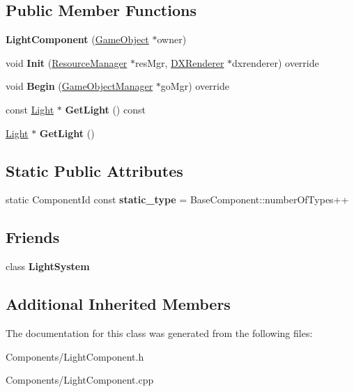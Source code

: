 \subsection*{Public Member Functions}
\begin{DoxyCompactItemize}
\item 
\mbox{\label{classLightComponent_ac374477ea9f077553f23f57313d9338d}} 
{\bfseries Light\+Component} (\hyperlink{classGameObject}{Game\+Object} $\ast$owner)
\item 
\mbox{\label{classLightComponent_abb4382140092cd7b54f3cf1d37a31c7b}} 
void {\bfseries Init} (\hyperlink{classResourceManager}{Resource\+Manager} $\ast$res\+Mgr, \hyperlink{classDXRenderer}{D\+X\+Renderer} $\ast$dxrenderer) override
\item 
\mbox{\label{classLightComponent_a5cb42a615fc057b75e003e69aee729ef}} 
void {\bfseries Begin} (\hyperlink{classGameObjectManager}{Game\+Object\+Manager} $\ast$go\+Mgr) override
\item 
\mbox{\label{classLightComponent_ae1443763b20f9aa6167a774b193a67bd}} 
const \hyperlink{classLight}{Light} $\ast$ {\bfseries Get\+Light} () const
\item 
\mbox{\label{classLightComponent_a22972b771f48b615fab04ab09f214225}} 
\hyperlink{classLight}{Light} $\ast$ {\bfseries Get\+Light} ()
\end{DoxyCompactItemize}
\subsection*{Static Public Attributes}
\begin{DoxyCompactItemize}
\item 
\mbox{\label{classLightComponent_a4fa80064b4e8acd677e551783f827c56}} 
static Component\+Id const {\bfseries static\+\_\+type} = Base\+Component\+::number\+Of\+Types++
\end{DoxyCompactItemize}
\subsection*{Friends}
\begin{DoxyCompactItemize}
\item 
\mbox{\label{classLightComponent_acad5260b1bd2b9cbfe38d8f2471f072b}} 
class {\bfseries Light\+System}
\end{DoxyCompactItemize}
\subsection*{Additional Inherited Members}


The documentation for this class was generated from the following files\+:\begin{DoxyCompactItemize}
\item 
Components/Light\+Component.\+h\item 
Components/Light\+Component.\+cpp\end{DoxyCompactItemize}
